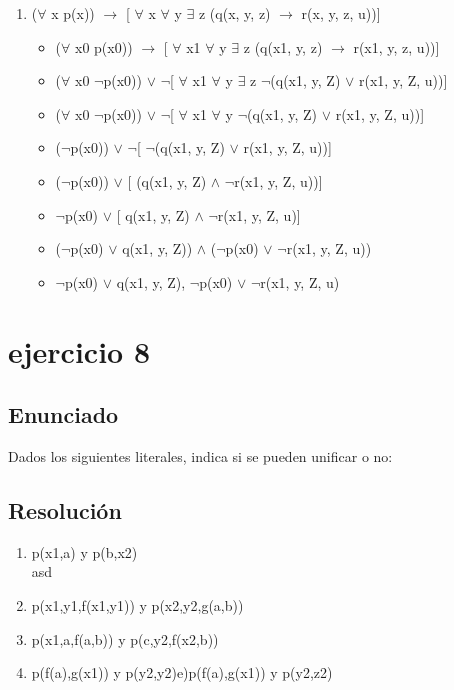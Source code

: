 \documentclass[a4paper,10pt]{article}
\begin{document}
\begin{enumerate}
\begin{itemize}
	\end{itemize}
	\item ($\forall$ x p(x)) $\rightarrow$ [ $\forall$ x $\forall$ y $\exists$ z (q(x, y, z) $\rightarrow$ r(x, y, z, u))]
	\begin{itemize}
		\item ($\forall$ x0 p(x0)) $\rightarrow$ [ $\forall$ x1 $\forall$ y $\exists$ z (q(x1, y, z) $\rightarrow$ r(x1, y, z, u))]
		\item ($\forall$ x0 $\lnot$p(x0)) $\lor$ $\lnot$[ $\forall$ x1 $\forall$ y $\exists$ z $\lnot$(q(x1, y, Z) $\lor$ r(x1, y, Z, u))]
		\item ($\forall$ x0 $\lnot$p(x0)) $\lor$ $\lnot$[ $\forall$ x1 $\forall$ y $\lnot$(q(x1, y, Z) $\lor$ r(x1, y, Z, u))]
		\item ($\lnot$p(x0)) $\lor$ $\lnot$[ $\lnot$(q(x1, y, Z) $\lor$ r(x1, y, Z, u))]
		\item ($\lnot$p(x0)) $\lor$ [ (q(x1, y, Z) $\land$ $\lnot$r(x1, y, Z, u))]
		\item $\lnot$p(x0) $\lor$ [ q(x1, y, Z) $\land$ $\lnot$r(x1, y, Z, u)]
		\item ($\lnot$p(x0) $\lor$ q(x1, y, Z)) $\land$ ($\lnot$p(x0) $\lor$ $\lnot$r(x1, y, Z, u))
		\item $\lnot$p(x0) $\lor$ q(x1, y, Z), $\lnot$p(x0) $\lor$ $\lnot$r(x1, y, Z, u)
	\end{itemize}

\end{enumerate}


\vspace{1cm}
\section{ejercicio 8}
\subsection{Enunciado}
Dados los siguientes literales, indica si se pueden unificar o no:
\subsection{Resolución}
\begin{enumerate}
	\item p(x1,a) y p(b,x2)
	\\asd
	\item p(x1,y1,f(x1,y1)) y p(x2,y2,g(a,b))

	\item p(x1,a,f(a,b)) y p(c,y2,f(x2,b))

	\item p(f(a),g(x1)) y p(y2,y2)e)p(f(a),g(x1)) y p(y2,z2)

\end{enumerate}

\end{document}
